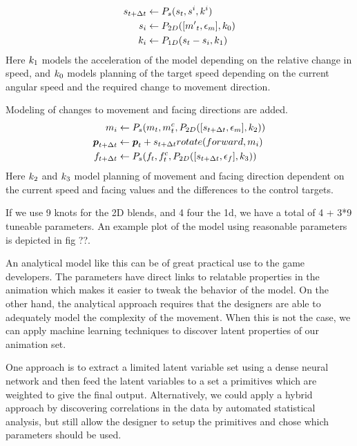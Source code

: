 \begin{subequations}
\begin{align}
    s_{t+\Delta{t}}&\leftarrow{}P_s(s_t,s^i,k^i)\\
    s_i&\leftarrow{}P_{2D}([{m'}_t,\epsilon_m],k_0)\\
    k_i&\leftarrow{}P_{1D}(s_t-s_i, k_1)
\end{align}
\end{subequations}
Here $k_1$ models the acceleration of the model depending on the relative change in speed, and $k_0$ models planning of the target speed depending on the current angular speed and the required change to movement direction.

Modeling of changes to movement and facing directions are added.
\begin{subequations}
\begin{align}
    m_i&\leftarrow P_s(m_t,m^c_t,P_{2D}([s_{t+\Delta{t}},\epsilon_m], k_2))\\ 
    \boldsymbol{p }_{t+\Delta{t}}&\leftarrow{}\boldsymbol{p }_t+s_{t+\Delta{t}}{}rotate(forward,m_i)\\
    f_{t+\Delta{t}}&\leftarrow P_s(f_t,f^c_t,P_{2D}([s_{t+\Delta{t}},\epsilon_f], k_3))
\end{align}
\end{subequations}
Here $k_2$ and $k_3$ model planning of movement and facing direction dependent on the current speed and facing values and the differences to the control targets.

If we use 9 knots for the 2D blends, and 4 four the 1d, we have a total of 4 + 3*9 tuneable parameters. An example plot of the model using reasonable parameters is depicted in fig ??.

An analytical model like this can be of great practical use to the game developers. The parameters have direct links to relatable properties in the animation which makes it easier to tweak the behavior of the model. On the other hand, the analytical approach requires that the designers are able to adequately model the complexity of the movement. When this is not the case, we can apply machine learning techniques to discover latent properties of our animation set. 

One approach is to extract a limited latent variable set using a dense neural network and then feed the latent variables to a set a primitives which are weighted to give the final output. 
Alternatively, we could apply a hybrid approach by discovering correlations in the data by automated statistical analysis, but still allow the designer to setup the primitives and chose which parameters should be used. 


